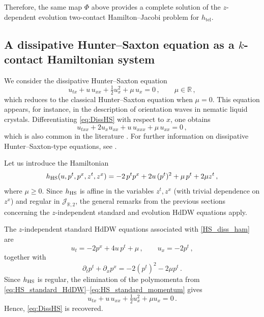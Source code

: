 \documentclass[11pt,twoside]{article}
\theoremstyle{plain}
\theoremstyle{definition}
\theoremstyle{remark}
\begin{document}
Therefore, the same map \(\Phi\) above provides a complete solution of the \(z\)-dependent
evolution two-contact Hamilton--Jacobi problem for \(h_{\mathrm{tel}}\).



\subsection{A dissipative Hunter--Saxton equation as a \texorpdfstring{$k$}{}-contact Hamiltonian system}

We consider the dissipative Hunter--Saxton equation
\begin{equation}\label{eq:DissHS}
u_{tx}+u\,u_{xx}+\tfrac12 u_x^2+\mu\,u_x=0\,,\qquad \mu\in\mathbb{R}\,,
\end{equation}
which reduces to the classical Hunter--Saxton equation when $\mu=0$. This equation appears, for instance, in the description of orientation waves in nematic liquid crystals. Differentiating \eqref{eq:DissHS} with respect to $x$, one obtains
\begin{equation}
u_{txx}+2u_xu_{xx}+u\,u_{xxx}+\mu\,u_{xx}=0\,,
\end{equation}
which is also common in the literature \cite{HZ_94}. For further information on dissipative Hunter--Saxton-type equations, see \cite{LY_14,Wei_12,HS_91,HZ_94,Len_07,WY_11,LZ_11}.

Let us introduce the Hamiltonian
\begin{equation}\label{HS_diss_ham}
h_{\rm HS}(u,p^t,p^x,z^t,z^x)=-2\,p^t p^x+2u\,(p^t)^2+\mu\,p^t+2\mu  z^t\,,
\end{equation}
where $\mu\ge0$. Since $h_{\rm HS}$ is affine in the variables $z^t,z^x$ (with trivial dependence on $z^x$) and regular in $\mathcal{J}_{\mathbb{R},2}$, the general remarks from the previous sections concerning the $z$-independent standard and evolution HdDW equations apply.

The $z$-independent standard HdDW equations associated with \eqref{HS_diss_ham} are
\begin{equation}\label{eq:HS_standard_HdDW}
u_t=-2p^x+4u\,p^t+\mu\,,\qquad
u_x=-2p^t\,,
\end{equation}
together with
\begin{equation}\label{eq:HS_standard_momentum}
\partial_t p^t+\partial_x p^x=-2(p^t)^2-2\mu  p^t\,.
\end{equation} Since $h_{\rm HS}$ is regular, the 
elimination of the polymomenta from \eqref{eq:HS_standard_HdDW}--\eqref{eq:HS_standard_momentum} gives
\[
u_{tx}+u\,u_{xx}+\tfrac12 u_x^2+\mu u_x=0\,.
\]
Hence, \eqref{eq:DissHS} is recovered.
\end{document}
